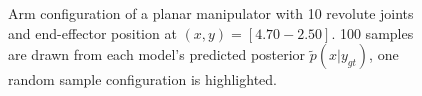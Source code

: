 \documentclass[conference]{IEEEtran}
\begin{document}
\begin{figure}[tbh]
\centering

    \caption{\label{fig:posterior:10dof} Arm configuration of a planar manipulator with 10 revolute joints and end-effector position at $(x, y) = [4.70 -2.50]$. 100 samples are drawn from each model's predicted posterior $\tilde{p}(x | y_{gt})$, one random sample configuration is highlighted.}
\end{figure}
\end{document}
